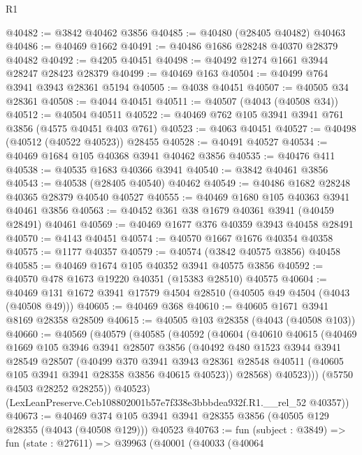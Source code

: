 \begin{lexlean}{R1}
\begin{coremodule}
@40482 := @3842 @40462 @3856
@40485 := @40480 (@28405 @40482) @40463
@40486 := @40469 @1662
@40491 := @40486 @1686 @28248 @40370 @28379 @40482
@40492 := @4205 @40451
@40498 := @40492 @1274 @1661 @3944 @28247 @28423 @28379
@40499 := @40469 @163
@40504 := @40499 @764 @3941 @3943 @28361 @5194
@40505 := @4038 @40451
@40507 := @40505 @34 @28361
@40508 := @4044 @40451
@40511 := @40507 (@4043 (@40508 @34))
@40512 := @40504 @40511
@40522 := @40469 @762 @105 @3941 @3941 @761 @3856 (@4575 @40451 @403 @761)
@40523 := @4063 @40451
@40527 := @40498 (@40512 (@40522 @40523)) @28455
@40528 := @40491 @40527
@40534 := @40469 @1684 @105 @40368 @3941 @40462 @3856
@40535 := @40476 @411
@40538 := @40535 @1683 @40366 @3941
@40540 := @3842 @40461 @3856
@40543 := @40538 (@28405 @40540) @40462
@40549 := @40486 @1682 @28248 @40365 @28379 @40540 @40527
@40555 := @40469 @1680 @105 @40363 @3941 @40461 @3856
@40563 := @40452 @361 @38 @1679 @40361 @3941 (@40459 @28491) @40461
@40569 := @40469 @1677 @376 @40359 @3943 @40458 @28491
@40570 := @4143 @40451
@40574 := @40570 @1667 @1676 @40354 @40358
@40575 := @1177 @40357
@40579 := @40574 (@3842 @40575 @3856) @40458
@40585 := @40469 @1674 @105 @40352 @3941 @40575 @3856
@40592 := @40570 @478 @1673 @19220 @40351 (@15383 @28510) @40575
@40604 := @40469 @131 @1672 @3941 @17579 @4504 @28510 (@40505 @49 @4504 (@4043 (@40508 @49)))
@40605 := @40469 @368
@40610 := @40605 @1671 @3941 @8169 @28358 @28509
@40615 := @40505 @103 @28358 (@4043 (@40508 @103))
@40660 := @40569
    (@40579
      (@40585
        (@40592
          (@40604
            (@40610
              @40615
              (@40469
                @1669
                @105
                @3946
                @3941
                @28507
                @3856
                (@40492
                  @480
                  @1523
                  @3944
                  @3941
                  @28549
                  @28507
                  (@40499
                    @370
                    @3941
                    @3943
                    @28361
                    @28548
                    @40511
                    (@40605 @105 @3941 @3941 @28358 @3856 @40615 @40523))
                  @28568)
                @40523)))
          (@5750 @4503 @28252 @28255))
        @40523)
      (LexLeanPreserve.Ceb108802001b57e7f338e3bbbdea932f.R1.__rel_52 @40357))
@40673 := @40469
    @374
    @105
    @3941
    @3941
    @28355
    @3856
    (@40505 @129 @28355 (@4043 (@40508 @129)))
    @40523
@40763 := fun (subject : @3849) =>
  fun (state : @27611) =>
  @39963
    (@40001
      (@40033
        (@40064

\end{coremodule}
\end{lexlean}
